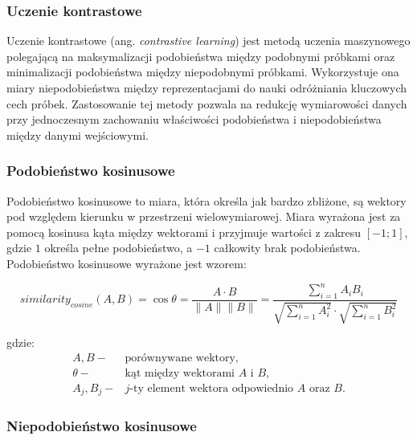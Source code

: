         \subsubsection{Uczenie kontrastowe}

            Uczenie kontrastowe (ang. \textit{contrastive learning}) \cite{Bromley:1993} jest metodą uczenia maszynowego polegającą na maksymalizacji podobieństwa między podobnymi próbkami oraz minimalizacji podobieństwa między niepodobnymi próbkami. Wykorzystuje ona miary niepodobieństwa między reprezentacjami do nauki odróżniania kluczowych cech próbek. Zastosowanie tej metody pozwala na redukcję wymiarowości danych przy jednoczesnym zachowaniu właściwości podobieństwa i niepodobieństwa między danymi wejściowymi.

        \subsubsection{Podobieństwo kosinusowe}

            Podobieństwo kosinusowe to miara, która określa jak bardzo zbliżone, są wektory pod względem kierunku w przestrzeni wielowymiarowej. Miara wyrażona jest za pomocą kosinusa kąta między wektorami i przyjmuje wartości z zakresu $[-1; 1]$, gdzie $1$ określa pełne podobieństwo, a $-1$ całkowity brak podobieństwa. Podobieństwo kosinusowe wyrażone jest wzorem:

            \begin{equation}
                similarity_{cosine}(A, B) = \cos{\theta} = \frac{A \cdot B}{\|A\| \|B\|} = \frac{
                    \sum^{n}_{i = 1}A_i B_i
                }{
                    \sqrt{
                        \sum^{n}_{i = 1}A_i^2
                    }
                    \cdot
                    \sqrt{
                        \sum^{n}_{i = 1}B_i^2
                    }
                }
            \end{equation}

            gdzie:
            \begin{align*}
                A, B -& \text{porównywane wektory,} \\
                \theta -& \text{kąt między wektorami $A$ i $B$,} \\
                A_j, B_j -& \text{$j$-ty element wektora odpowiednio $A$ oraz $B$.}
            \end{align*}

        \subsubsection{Niepodobieństwo kosinusowe}


